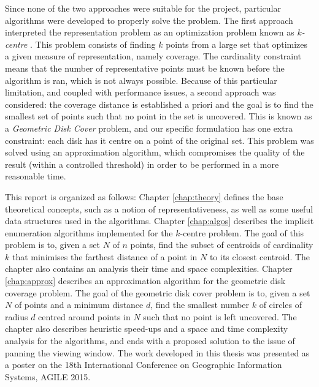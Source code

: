 Since none of the two approaches were suitable for the project, particular algorithms were developed to properly solve the problem. The first approach interpreted the representation problem as an optimization problem known as \emph{$k$-centre} \cite{facilityloc}. This problem consists of finding $k$ points from a large set that optimizes a given measure of representation, namely coverage. The cardinality constraint means that the number of representative points must be known before the algorithm is ran, which is not always possible. Because of this particular limitation, and coupled with performance issues, a second approach was considered: the coverage distance is established a priori and the goal is to find the smallest set of points such that no point in the set is uncovered. This is known as a \emph{Geometric Disk Cover} \cite{gdccomplex} problem, and our specific formulation has one extra constraint: each disk has it centre on a point of the original set. This problem was solved using an approximation algorithm, which compromises the quality of the result (within a controlled threshold) in order to be performed in a more reasonable time. 

This report is organized as follows:
Chapter \ref{chap:theory} defines the base theoretical concepts, such as a notion of representativeness, as well as some useful data structures used in the algorithms. Chapter \ref{chap:algos} describes the implicit enumeration algorithms implemented for the $k$-centre problem. The goal of this problem is to, given a set $N$ of $n$ points, find the subset of centroids of cardinality $k$ that minimises the farthest distance of a point in $N$ to its closest centroid. The chapter also contains an analysis their time and space complexities. Chapter \ref{chap:approx} describes an approximation algorithm for the geometric disk coverage problem. The goal of the geometric disk cover problem is to, given a set $N$ of points and a minimum distance $d$, find the smallest number $k$ of circles of radius $d$ centred around points in $N$ such that no point is left uncovered. The chapter also describes heuristic speed-ups and a space and time complexity analysis for the algorithms, and ends with a proposed solution to the issue of panning the viewing window. The work developed in this thesis was presented as a poster \cite{valenca} on the 18th International Conference on Geographic Information Systems, AGILE 2015.